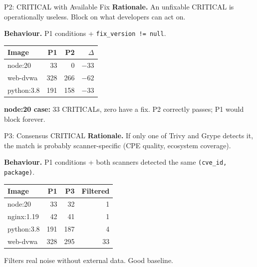 \documentclass[aspectratio=169]{beamer}
\begin{document}
\begin{frame}{P2: CRITICAL with Available Fix}
\textbf{Rationale.} An unfixable CRITICAL is operationally useless. Block on what developers can act on.

\medskip
\textbf{Behaviour.} P1 conditions + \texttt{fix\_version != null}.

\medskip
\small
\begin{tabular}{lrrr}
\toprule
Image & P1 & P2 & $\Delta$ \\
\midrule
node:20 & 33 & 0 & $-33$ \\
web-dvwa & 328 & 266 & $-62$ \\
python:3.8 & 191 & 158 & $-33$ \\
\bottomrule
\end{tabular}

\medskip
\textbf{node:20 case:} 33 CRITICALs, zero have a fix. P2 correctly passes; P1 would block forever.
\end{frame}

\begin{frame}{P3: Consensus CRITICAL}
\textbf{Rationale.} If only one of Trivy and Grype detects it, the match is probably scanner-specific (CPE quality, ecosystem coverage).

\medskip
\textbf{Behaviour.} P1 conditions + both scanners detected the same \texttt{(cve\_id, package)}.

\medskip
\small
\begin{tabular}{lrrr}
\toprule
Image & P1 & P3 & Filtered \\
\midrule
node:20 & 33 & 32 & 1 \\
nginx:1.19 & 42 & 41 & 1 \\
python:3.8 & 191 & 187 & 4 \\
web-dvwa & 328 & 295 & 33 \\
\bottomrule
\end{tabular}

\medskip
Filters real noise without external data. Good baseline.
\end{frame}
\end{document}
